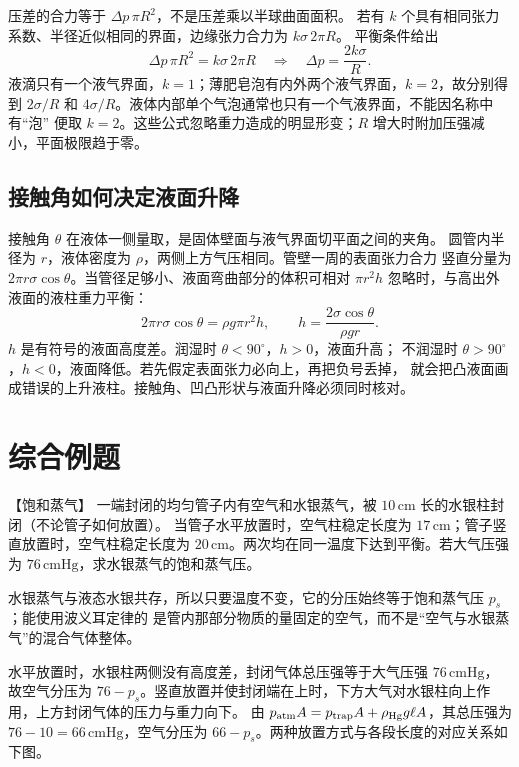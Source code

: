 {压差的合力等于 $\Delta p\,\pi R^2$，不是压差乘以半球曲面面积。
若有 $k$ 个具有相同张力系数、半径近似相同的界面，边缘张力合力为 $k\sigma\,2\pi R$。
平衡条件给出
\begin{equation}
 \Delta p\,\pi R^2=k\sigma\,2\pi R
 \quad\Longrightarrow\quad
 \Delta p=\frac{2k\sigma}{R}.
\end{equation}
液滴只有一个液气界面，$k=1$；薄肥皂泡有内外两个液气界面，$k=2$，故分别得到
$2\sigma/R$ 和 $4\sigma/R$。液体内部单个气泡通常也只有一个气液界面，不能因名称中有“泡”
便取 $k=2$。这些公式忽略重力造成的明显形变；$R$ 增大时附加压强减小，平面极限趋于零。

\subsection{接触角如何决定液面升降}

接触角 $\theta$ 在液体一侧量取，是固体壁面与液气界面切平面之间的夹角。
圆管内半径为 $r$，液体密度为 $\rho$，两侧上方气压相同。管壁一周的表面张力合力
竖直分量为 $2\pi r\sigma\cos\theta$。当管径足够小、液面弯曲部分的体积可相对
$\pi r^2h$ 忽略时，与高出外液面的液柱重力平衡：
\[
 2\pi r\sigma\cos\theta=\rho g\pi r^2h,
 \qquad h=\frac{2\sigma\cos\theta}{\rho gr}.
\]
$h$ 是有符号的液面高度差。润湿时 $\theta<90^\circ$，$h>0$，液面升高；
不润湿时 $\theta>90^\circ$，$h<0$，液面降低。若先假定表面张力必向上，再把负号丢掉，
就会把凸液面画成错误的上升液柱。接触角、凹凸形状与液面升降必须同时核对。


\section{综合例题}
\begin{origexamplebox}{【饱和蒸气】}\label{ch17:ex:s31-22-1}
一端封闭的均匀管子内有空气和水银蒸气，被 $10\,\mathrm{cm}$ 长的水银柱封闭（不论管子如何放置）。
当管子水平放置时，空气柱稳定长度为 $17\,\mathrm{cm}$；管子竖直放置时，空气柱稳定长度为
$20\,\mathrm{cm}$。两次均在同一温度下达到平衡。若大气压强为 $76\,\mathrm{cmHg}$，求水银蒸气的饱和蒸气压。

\ThQMercury
\end{origexamplebox}

\begin{xesolution}
水银蒸气与液态水银共存，所以只要温度不变，它的分压始终等于饱和蒸气压 $p_s$；能使用波义耳定律的
是管内那部分物质的量固定的空气，而不是“空气与水银蒸气”的混合气体整体。

水平放置时，水银柱两侧没有高度差，封闭气体总压强等于大气压强 $76\,\mathrm{cmHg}$，故空气分压为
$76-p_s$。竖直放置并使封闭端在上时，下方大气对水银柱向上作用，上方封闭气体的压力与重力向下。
由 $p_{\rm atm}A=p_{\rm trap}A+\rho_{\rm Hg}g\ell A$，其总压强为
$76-10=66\,\mathrm{cmHg}$，空气分压为 $66-p_s$。两种放置方式与各段长度的对应关系如下图。


\end{xesolution}}
